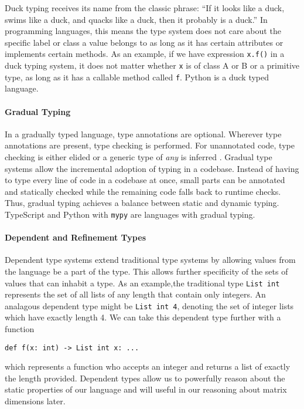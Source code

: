\documentclass{report}
\begin{document}
Duck typing receives its name from the classic phrase: ``If it looks like a duck, swims like a duck, and quacks like a duck, then it probably is a duck.'' In programming languages, this means the type system does not care about the specific label or class a value belongs to as long as it has certain attributes or implements certain methods. As an example, if we have expression \texttt{x.f()} in a duck typing system, it does not matter whether \texttt{x} is of class A or B or a primitive type, as long as it has a callable method called \texttt{f}. Python is a duck typed language.

\paragraph{Gradual Typing}

In a gradually typed language, type annotations are optional. Wherever type annotations are present, type checking is performed. For unannotated code, type checking is either elided or a generic type of \textit{any} is inferred \cite{PythonDropbox}. Gradual type systems allow the incremental adoption of typing in a codebase. Instead of having to type every line of code in a codebase at once, small parts can be annotated and statically checked while the remaining code falls back to runtime checks. Thus, gradual typing achieves a balance between static and dynamic typing. TypeScript and Python with \texttt{mypy} are languages with gradual typing.

\paragraph{Dependent and Refinement Types}

Dependent type systems extend traditional type systems by allowing values from the language be a part of the type. This allows further specificity of the sets of values that can inhabit a type. As an example,the traditional type \texttt{List int} represents the set of all lists of any length that contain only integers. An analagous dependent type might be \texttt{List int 4}, denoting the set of integer lists which have exactly length 4. We can take this dependent type further with a function

\begin{singlespace*}\begin{center}
    \texttt{def f(x: int) -> List int x: ...}
\end{center} \end{singlespace*}
which represents a function who accepts an integer and returns a list of exactly the length provided. Dependent types allow us to powerfully reason about the static properties of our language and will useful in our reasoning about matrix dimensions later.
\end{document}
